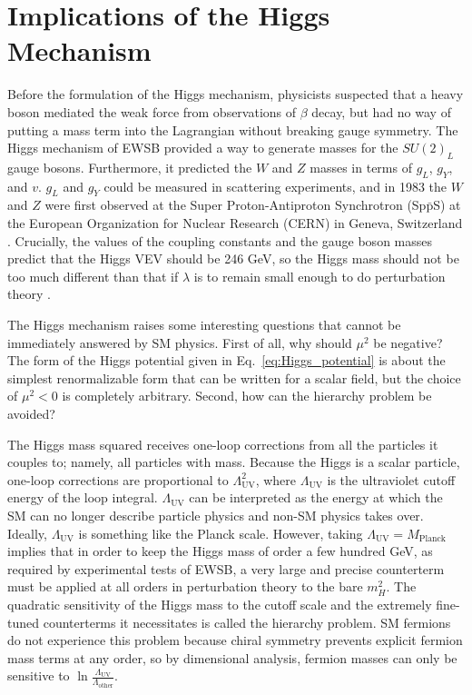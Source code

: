\documentclass[dissertation.tex]{subfiles}
\begin{document}
\section{Implications of the Higgs Mechanism}
\label{sec:Implications of the Higgs Mechanism}

Before the formulation of the Higgs mechanism, physicists suspected that a heavy boson mediated the weak force from observations of $\beta$ decay, but had no way of putting a mass term into the Lagrangian without breaking gauge symmetry.  The Higgs mechanism of EWSB provided a way to generate masses for the $SU(2)_{L}$ gauge bosons.  Furthermore, it predicted the $W$ and $Z$ masses in terms of $g_{L}$, $g_{Y}$, and $v$.  $g_{L}$ and $g_{Y}$ could be measured in scattering experiments, and in 1983 the $W$ and $Z$ were first observed at the Super Proton-Antiproton Synchrotron (Sp$\bar{\mbox{p}}$S) at the European Organization for Nuclear Research (CERN) in Geneva, Switzerland \cite{Arnison:1983rp,Arnison1983398}.  Crucially, the values of the coupling constants and the gauge boson masses predict that the Higgs VEV should be 246 GeV, so the Higgs mass should not be too much different than that if $\lambda$ is to remain small enough to do perturbation theory \cite{Gunion:425736}.

The Higgs mechanism raises some interesting questions that cannot be immediately answered by SM physics.  First of all, why should $\mu^{2}$ be negative?  The form of the Higgs potential given in Eq.~\ref{eq:Higgs_potential} is about the simplest renormalizable form that can be written for a scalar field, but the choice of $\mu^{2} < 0$ is completely arbitrary.  Second, how can the hierarchy problem be avoided?

The Higgs mass squared receives one-loop corrections from all the particles it couples to; namely, all particles with mass.  Because the Higgs is a scalar particle, one-loop corrections are proportional to $\Lambda_{\mathrm{UV}}^{2}$, where $\Lambda_{\mathrm{UV}}$ is the ultraviolet cutoff energy of the loop integral.  $\Lambda_{\mathrm{UV}}$ can be interpreted as the energy at which the SM can no longer describe particle physics and non-SM physics takes over.  Ideally, $\Lambda_{\mathrm{UV}}$ is something like the Planck scale.  However, taking $\Lambda_{\mathrm{UV}} = M_{\mathrm{Planck}}$ implies that in order to keep the Higgs mass of order a few hundred GeV, as required by experimental tests of EWSB, a very large and precise counterterm must be applied at all orders in perturbation theory to the bare $m_{H}^{2}$.  The quadratic sensitivity of the Higgs mass to the cutoff scale and the extremely fine-tuned counterterms it necessitates is called the hierarchy problem.  SM fermions do not experience this problem because chiral symmetry prevents explicit fermion mass terms at any order, so by dimensional analysis, fermion masses can only be sensitive to $\ln\frac{\Lambda_{\mathrm{UV}}}{\Lambda_{\mathrm{other}}}$.
\end{document}
